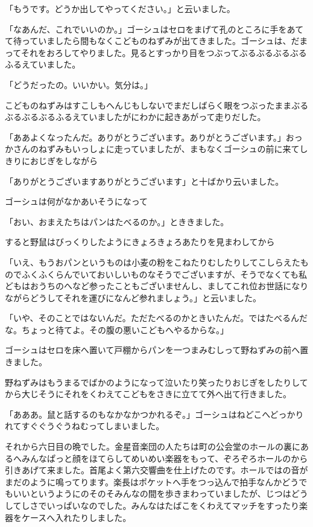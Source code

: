 \documentclass[uplatex,a5paper,twoside]{jsarticle}
\begin{document}
「もうです。どうか出してやってください。」と云いました。

「なあんだ、これでいいのか。」ゴーシュはセロをまげて孔のところに手をあてて待っていましたら間もなくこどものねずみが出てきました。ゴーシュは、だまってそれをおろしてやりました。見るとすっかり目をつぶってぶるぶるぶるぶるふるえていました。

「どうだったの。いいかい。気分は。」

こどものねずみはすこしもへんじもしないでまだしばらく眼をつぶったままぶるぶるぶるぶるふるえていましたがにわかに起きあがって走りだした。

「ああよくなったんだ。ありがとうございます。ありがとうございます。」おっかさんのねずみもいっしょに走っていましたが、まもなくゴーシュの前に来てしきりにおじぎをしながら

「ありがとうございますありがとうございます」と十ばかり云いました。

ゴーシュは何がなかあいそうになって

「おい、おまえたちはパンはたべるのか。」とききました。

すると野鼠はびっくりしたようにきょろきょろあたりを見まわしてから

「いえ、もうおパンというものは小麦の粉をこねたりむしたりしてこしらえたものでふくふくらんでいておいしいものなそうでございますが、そうでなくても私どもはおうちのへなど参ったこともございませんし、ましてこれ位お世話になりながらどうしてそれを運びになんど参れましょう。」と云いました。

「いや、そのことではないんだ。ただたべるのかときいたんだ。ではたべるんだな。ちょっと待てよ。その腹の悪いこどもへやるからな。」

ゴーシュはセロを床へ置いて戸棚からパンを一つまみむしって野ねずみの前へ置きました。

野ねずみはもうまるでばかのようになって泣いたり笑ったりおじぎをしたりしてから大じそうにそれをくわえてこどもをさきに立てて外へ出て行きました。

「あああ。鼠と話するのもなかなかつかれるぞ。」ゴーシュはねどこへどっかりれてすぐぐうぐうねむってしまいました。

それから六日目の晩でした。金星音楽団の人たちは町の公会堂のホールの裏にあるへみんなぱっと顔をほてらしてめいめい楽器をもって、ぞろぞろホールのから引きあげて来ました。首尾よく第六交響曲を仕上げたのです。ホールではの音がまだのように鳴ってります。楽長はポケットへ手をつっ込んで拍手なんかどうでもいいというようにのそのそみんなの間を歩きまわっていましたが、じつはどうしてしさでいっぱいなのでした。みんなはたばこをくわえてマッチをすったり楽器をケースへ入れたりしました。
\end{document}
